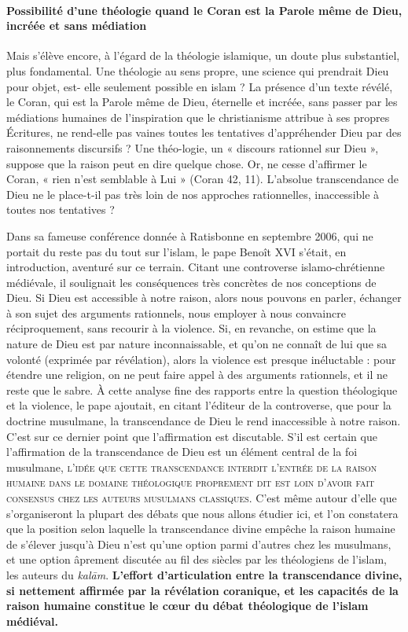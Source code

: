 \paragraph{Possibilité d'une théologie quand le Coran est la Parole même de Dieu, incréée et sans médiation}
Mais s'élève encore, à l'égard de la théologie islamique, un doute plus
substantiel, plus fondamental. Une théologie au sens propre, une science
qui prendrait Dieu pour objet, est- elle seulement possible en islam ?
La présence d'un texte révélé, le Coran, qui est la Parole même de Dieu,
éternelle et incréée, sans passer par les médiations humaines de
l'inspiration que le christianisme attribue à ses propres Écritures, ne
rend-elle pas vaines toutes les tentatives d'appréhender Dieu par des
raisonnements discursifs ? Une théo-logie, un
« discours rationnel sur Dieu », suppose que la raison peut en dire
quelque chose. Or, ne cesse d'affirmer le Coran, « rien n'est semblable
à Lui » (Coran 42, 11). L'absolue transcendance de Dieu ne le place-t-il
pas très loin de nos approches rationnelles, inaccessible à toutes nos
tentatives ?

Dans sa fameuse conférence donnée à Ratisbonne en septembre 2006, qui ne
portait du reste pas du tout sur l'islam, le pape Benoît XVI s'était, en
introduction, aventuré sur ce terrain. Citant une controverse
islamo-chrétienne médiévale, il soulignait les conséquences très
concrètes de nos conceptions de Dieu. Si Dieu est accessible à notre
raison, alors nous pouvons en parler, échanger à son sujet des arguments
rationnels, nous employer à nous convaincre réciproquement, sans
recourir à la violence. Si, en revanche, on estime que la nature de Dieu
est par nature inconnaissable, et qu'on ne connaît de lui que sa volonté
(exprimée par révélation), alors la violence est presque inéluctable :
pour étendre une religion, on ne peut faire appel à des arguments
rationnels, et il ne reste que le sabre. À cette analyse fine des
rapports entre la question théologique et la violence, le pape ajoutait,
en citant l'éditeur de la controverse, que pour la doctrine musulmane,
la transcendance de Dieu le rend inaccessible à notre raison. C'est sur
ce dernier point que l'affirmation est discutable. S'il est certain que
l'affirmation de la transcendance de Dieu est un élément central de la
foi
musulmane, \textsc{l'idée que cette transcendance interdit l'entrée de la raison
humaine dans le domaine théologique proprement dit est loin d'avoir fait
consensus chez les auteurs musulmans classiques}. C'est même autour
d'elle que s'organiseront la plupart des débats que nous allons étudier
ici, et l'on constatera que la position selon laquelle la transcendance
divine empêche la raison humaine de s'élever jusqu'à Dieu n'est qu'une
option parmi d'autres chez les musulmans, et une option âprement
discutée au fil des siècles par les théologiens de l'islam, les auteurs
du \emph{kalām}. \textbf{L'effort d'articulation entre la transcendance divine,
si nettement affirmée par la révélation coranique, et les capacités de
la raison humaine constitue le cœur du débat théologique de l'islam
médiéval.}

